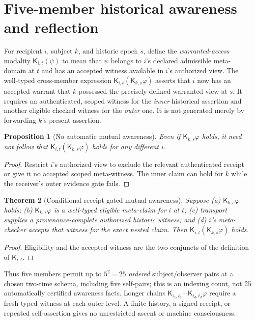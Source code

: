 \documentclass[11pt]{article}
\newtheorem{theorem}{Theorem}[section]
\newtheorem{proposition}[theorem]{Proposition}
\begin{document}
\section{Five-member historical awareness and reflection}
For recipient $i$, subject $k$, and historic epoch $s$, define the \emph{warranted-access} modality $\mathsf K_{i,t}(\psi)$ to mean that $\psi$ belongs to $i$'s declared admissible meta-domain at $t$ and has an accepted witness available in $i$'s authorized view. The well-typed cross-member expression $\mathsf K_{i,t}(\mathsf K_{k,s}\varphi)$ asserts that $i$ now has an accepted warrant that $k$ possessed the precisely defined warranted view at $s$. It requires an authenticated, scoped witness for the \emph{inner} historical assertion and another eligible checked witness for the \emph{outer} one. It is not generated merely by forwarding $k$'s present assertion.
\begin{proposition}[No automatic mutual awareness]
Even if $\mathsf K_{k,s}\varphi$ holds, it need not follow that $\mathsf K_{i,t}(\mathsf K_{k,s}\varphi)$ holds for any different $i$.
\end{proposition}
\begin{proof}Restrict $i$'s authorized view to exclude the relevant authenticated receipt or give it no accepted scoped meta-witness. The inner claim can hold for $k$ while the receiver's outer evidence gate fails.\end{proof}
\begin{theorem}[Conditional receipt-gated mutual awareness]
Suppose (a) $\mathsf K_{k,s}\varphi$ holds; (b) $\mathsf K_{k,s}\varphi$ is a well-typed eligible meta-claim for $i$ at $t$; (c) transport supplies a provenance-complete authorized historic witness; and (d) $i$'s meta-checker accepts that witness for the exact nested claim. Then $\mathsf K_{i,t}(\mathsf K_{k,s}\varphi)$ holds.
\end{theorem}
\begin{proof}Eligibility and the accepted witness are the two conjuncts of the definition of $\mathsf K_{i,t}$.\end{proof}
Thus five members permit up to $5^2=25$ \emph{ordered} subject/observer pairs at a chosen two-time schema, including five self-pairs; this is an indexing count, not 25 automatically certified awareness facts. Longer chains $\mathsf K_{i_1,t_1}\cdots\mathsf K_{i_d,t_d}\varphi$ require a fresh typed witness at each outer level. A finite history, a signed receipt, or repeated self-assertion gives no unrestricted ascent or machine consciousness.
\end{document}
